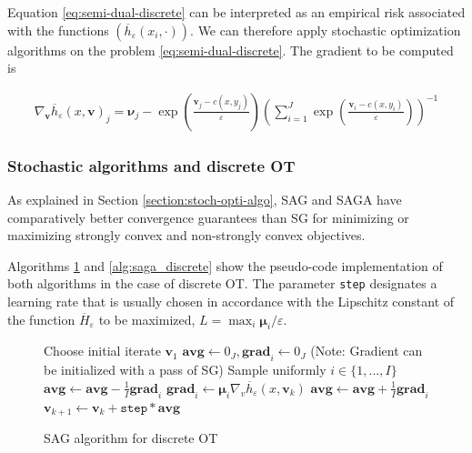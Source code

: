 Equation \eqref{eq:semi-dual-discrete} can be interpreted as an empirical risk associated with the functions $(\overline{h}_\varepsilon(x_i, \cdot))$. We can therefore apply stochastic optimization algorithms on the problem \eqref{eq:semi-dual-discrete}. The gradient to be computed is 

\begin{align*}  
    \nabla_{\bm{v}} \overline{h}_\varepsilon(x, \bm{v})_j = \bm{\nu}_j - \exp\left(\frac{\bm{v}_j - c(x, y_j)}{\varepsilon}\right) \left( \sum_{i=1}^J \exp\left(\frac{\bm{v}_i - c(x, y_i)}{\varepsilon}\right) \right)^{-1}
\end{align*}

\subsubsection{Stochastic algorithms and discrete OT}

As explained in Section \ref{section:stoch-opti-algo}, SAG and SAGA have comparatively better convergence guarantees than SG for minimizing or maximizing strongly convex and non-strongly convex objectives.

Algorithms \ref{alg:sag_discrete} and \ref{alg:saga_discrete} show the pseudo-code implementation of both algorithms in the case of discrete OT. The parameter \texttt{step} designates a learning rate that is usually chosen in accordance with the Lipschitz constant of the function $\overline{H}_\varepsilon$ to be maximized, $L = \max_i \bm{\mu}_i/\varepsilon$. 

\begin{figure}[h]
    \centering
    \begin{minipage}{.8\linewidth}
    \begin{algorithm}[H]
        \caption{SAG algorithm for discrete OT} \label{alg:sag_discrete}
        \begin{algorithmic}[1]
            \State Choose initial iterate $\bm{v}_1$
            \State $\mathbf{avg} \gets 0_J, \mathbf{grad}_i \gets 0_J$
            \State (Note: Gradient can be initialized with a pass of SG)
                \State Sample uniformly $i \in \{1, ..., I\}$
                \State $\mathbf{avg} \gets \mathbf{avg} - \frac{1}{I}\mathbf{grad}_i$
                \State $\mathbf{grad}_i \gets \bm{\mu}_i \nabla_v \overline{h}_\varepsilon(x, \bm{v}_k)$
                \State $\mathbf{avg} \gets \mathbf{avg} + \frac{1}{I}\mathbf{grad}_i$
                \State $\bm{v}_{k+1} \gets \bm{v}_k + \texttt{step} * \mathbf{avg}$
            \EndFor
        \end{algorithmic}
    \end{algorithm}
\end{minipage}
\end{figure}

